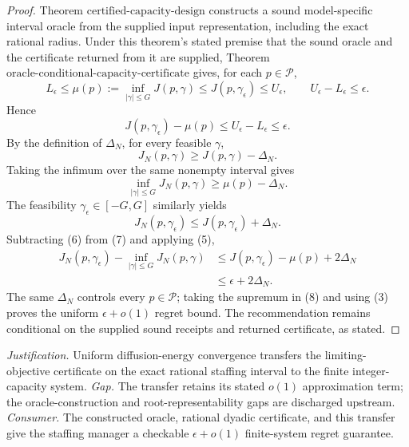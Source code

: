 \documentclass{article}
\begin{document}
\begin{proof}
Theorem \(\mathrm{certified\mbox{-}capacity\mbox{-}design}\) constructs a sound model-specific interval oracle from the supplied input representation, including the exact rational radius.  Under this theorem's stated premise that the sound oracle and the certificate returned from it are supplied, Theorem \(\mathrm{oracle\mbox{-}conditional\mbox{-}capacity\mbox{-}certificate}\) gives, for each \(p\in\mathcal P\),
\[
 L_\epsilon\leq\mu(p):=\inf_{|\gamma|\leq G}J(p,\gamma)
 \leq J(p,\gamma_\epsilon)\leq U_\epsilon,
 \qquad U_\epsilon-L_\epsilon\leq\epsilon.
\tag{4}
\]
Hence
\[
 J(p,\gamma_\epsilon)-\mu(p)
 \leq U_\epsilon-L_\epsilon\leq\epsilon.
\tag{5}
\]
By the definition of \(\Delta_N\), for every feasible \(\gamma\),
\[
 J_N(p,\gamma)\geq J(p,\gamma)-\Delta_N.
\]
Taking the infimum over the same nonempty interval gives
\[
 \inf_{|\gamma|\leq G}J_N(p,\gamma)
 \geq\mu(p)-\Delta_N.
\tag{6}
\]
The feasibility \(\gamma_\epsilon\in[-G,G]\) similarly yields
\[
 J_N(p,\gamma_\epsilon)
 \leq J(p,\gamma_\epsilon)+\Delta_N.
\tag{7}
\]
Subtracting (6) from (7) and applying (5),
\[
 \begin{aligned}
 J_N(p,\gamma_\epsilon)-\inf_{|\gamma|\leq G}J_N(p,\gamma)
 &\leq J(p,\gamma_\epsilon)-\mu(p)+2\Delta_N\\
 &\leq\epsilon+2\Delta_N.
 \end{aligned}
\tag{8}
\]
The same \(\Delta_N\) controls every \(p\in\mathcal P\); taking the supremum in (8) and using (3) proves the uniform \(\epsilon+o(1)\) regret bound.  The recommendation remains conditional on the supplied sound receipts and returned certificate, as stated.
\end{proof}
\par\smallskip\noindent \textit{Justification.} Uniform diffusion-energy convergence transfers the limiting-objective certificate on the exact rational staffing interval to the finite integer-capacity system. \textit{Gap.} The transfer retains its stated \(o(1)\) approximation term; the oracle-construction and root-representability gaps are discharged upstream. \textit{Consumer.} The constructed oracle, rational dyadic certificate, and this transfer give the staffing manager a checkable \(\epsilon+o(1)\) finite-system regret guarantee.
\end{document}
